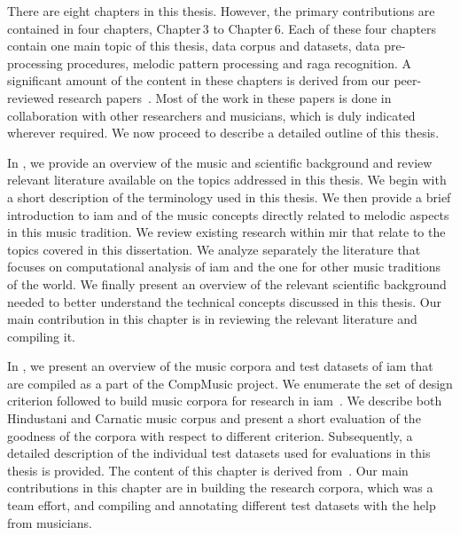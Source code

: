 There are eight chapters in this thesis. However, the primary contributions are contained in four chapters, Chapter\,3 to Chapter\,6. Each of these four chapters contain one main topic of this thesis, data corpus and datasets, data pre-processing procedures, melodic pattern processing and \gls{raga} recognition. A significant amount of the content in these chapters is derived from our peer-reviewed research papers~\cite{Gulati2014Tonic,gulati2014Landmark,gulati_SITIS_2014,gulati_ICASSP2015,gulati_ISMIR_2015,gulati_communities_2016,gulatiphrase_2016,gulati_tdms_2016}. Most of the work in these papers is done in collaboration with other researchers and musicians, which is duly indicated wherever required. We now proceed to describe a detailed outline of this thesis.

In , we provide an overview of the music and scientific background and review relevant literature available on the topics addressed in this thesis. We begin with a short description of the terminology used in this thesis. We then provide a brief introduction to \gls{iam} and of the music concepts directly related to melodic aspects in this music tradition. We review existing research within \gls{mir} that relate to the topics covered in this dissertation. We analyze separately the literature that focuses on computational analysis of \gls{iam} and the one for other music traditions of the world. We finally present an overview of the relevant scientific background needed to better understand the technical concepts discussed in this thesis. Our main contribution in this chapter is in reviewing the relevant literature and compiling it.

In , we present an overview of the music corpora and test datasets of \gls{iam} that are compiled as a part of the CompMusic project. We enumerate the set of design criterion followed to build music corpora for research in \gls{iam}~\citep{serra:14:corpus}. We describe both Hindustani and Carnatic music corpus and present a short evaluation of the goodness of the corpora with respect to different criterion. Subsequently, a detailed description of the individual test datasets used for evaluations in this thesis is provided. The content of this chapter is derived from~\citep{serra:14:corpus,CM_Corpora_Ajay14}. Our main contributions in this chapter are in building the research corpora, which was a team effort, and compiling and annotating different test datasets with the help from musicians.

